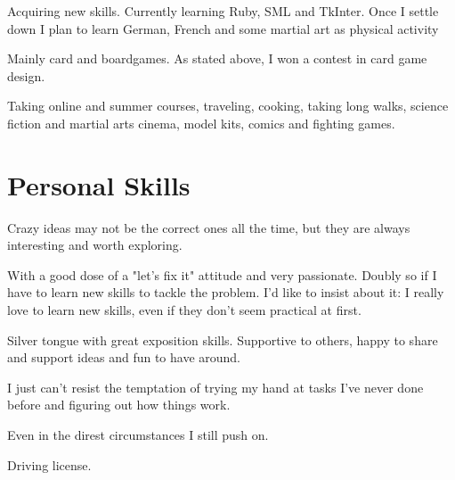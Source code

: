 \documentclass[11pt,a4paper,roman]{moderncv}
\begin{document}
	{Acquiring new skills. Currently learning Ruby, SML and TkInter.
	Once I settle down I plan to learn German, French and some martial art as physical activity}

	{Mainly card and boardgames. As stated above, I won a contest in card game design.}

	{Taking online and summer courses, traveling, cooking, taking long walks, science fiction and martial arts cinema, model kits, comics and fighting games.}



\section{Personal Skills}

{Crazy ideas may not be the correct ones all the time, but they are always interesting and worth exploring.}

{With a good dose of a "let's fix it" attitude and very passionate. Doubly so if I have to learn new skills to tackle the problem. I'd like to insist about it: I really love to learn new skills, even if they don't seem practical at first.}

{Silver tongue with great exposition skills. Supportive to others, happy to share and support ideas and fun to have around.}

{I just can't resist the temptation of trying my hand at tasks I've never done before and figuring out how things work.}

{Even in the direst circumstances I still push on.}

{Driving license.}


\renewcommand{\listitemsymbol}{-~}            %

\end{document}
